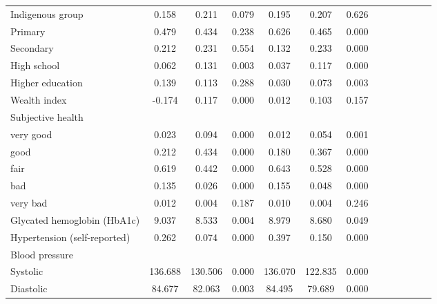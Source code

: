 \documentclass[12pt,english]{article}
\begin{document}
\begin{table}[!ht]
\begin{center}
\begin{adjustbox}{max width=\linewidth}
\begin{threeparttable}
{\begin{tabular}{l*{6}{S S}}
						Indigenous group    &       0.158&       0.211&       0.079&       0.195&       0.207&       0.626\\
						Primary             &       0.479&       0.434&       0.238&       0.626&       0.465&       0.000\\
						Secondary           &       0.212&       0.231&       0.554&       0.132&       0.233&       0.000\\
						High school         &       0.062&       0.131&       0.003&       0.037&       0.117&       0.000\\
						Higher education    &       0.139&       0.113&       0.288&       0.030&       0.073&       0.003\\
						Wealth index        &      -0.174&       0.117&       0.000&       0.012&       0.103&       0.157\\
						Subjective health       &&&&&&\\
						\hspace*{10mm}very good&       0.023&       0.094&       0.000&       0.012&       0.054&       0.001\\
						\hspace*{10mm}good     &       0.212&       0.434&       0.000&       0.180&       0.367&       0.000\\
						\hspace*{10mm}fair     &       0.619&       0.442&       0.000&       0.643&       0.528&       0.000\\
						\hspace*{10mm}bad      &       0.135&       0.026&       0.000&       0.155&       0.048&       0.000\\
						\hspace*{10mm}very bad &       0.012&       0.004&       0.187&       0.010&       0.004&       0.246\\
						Glycated hemoglobin (HbA1c)&       9.037&       8.533&       0.004&       8.979&       8.680&       0.049\\
						Hypertension (self-reported)       &       0.262&       0.074&       0.000&       0.397&       0.150&       0.000\\
						Blood pressure       &&&&&&\\
						\hspace*{10mm}Systolic             &     136.688&     130.506&       0.000&     136.070&     122.835&       0.000\\
						\hspace*{10mm}Diastolic            &      84.677&      82.063&       0.003&      84.495&      79.689&       0.000\\

\end{tabular}}
\end{threeparttable}
\end{adjustbox}
\end{center}
\end{table}
\end{document}
